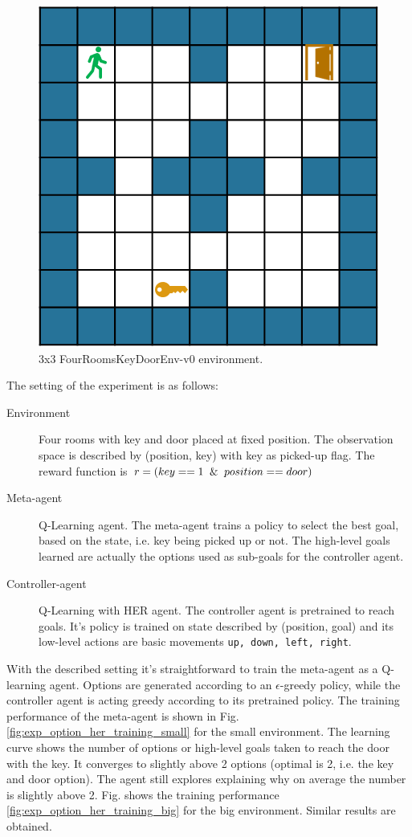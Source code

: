 \documentclass[conference]{IEEEtran}
\begin{document}
\begin{figure}[ht]
\centering
\includegraphics[width=0.5\columnwidth]{img/FourRoomsKeyDoorEnv-v0.png}
\caption{3x3 FourRoomsKeyDoorEnv-v0 environment.}
\label{fig:experiment_option_her_keydoor_env}
\end{figure}

The setting of the experiment is as follows:
\begin{description}
\item[Environment] Four rooms with key and door placed at fixed position. The observation space is described by (position, key) with key as picked-up flag. The reward function is $r = (key==1 \And position==door)$
\item[Meta-agent] Q-Learning agent. The meta-agent trains a policy to select the best goal, based on the state, i.e. key being picked up or not. The high-level goals learned are actually the options used as sub-goals for the controller agent. 
\item[Controller-agent] Q-Learning with HER agent. The controller agent is pretrained to reach goals. It's policy is trained on state described by (position, goal) and its low-level actions are basic movements \texttt{up, down, left, right}.
\end{description}

With the described setting it's straightforward to train the meta-agent as a Q-learning agent. Options are generated according to an $\epsilon$-greedy policy, while the controller agent is acting greedy according to its pretrained policy. The training performance of the meta-agent is shown in Fig. \ref{fig:exp_option_her_training_small} for the small environment.  The learning curve shows the number of options or high-level goals taken to reach the door with the key. It converges to slightly above 2 options (optimal is 2, i.e. the key and door option). The agent still explores explaining why on average the number is slightly above 2. Fig. shows the training performance \ref{fig:exp_option_her_training_big} for the big environment. Similar results are obtained.
\end{document}
